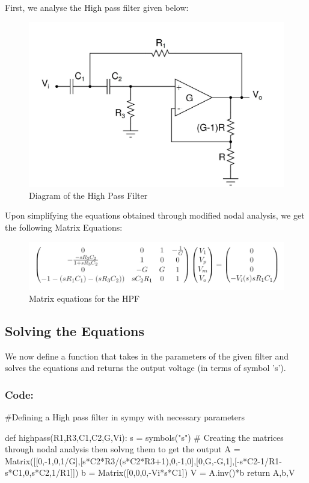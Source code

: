 \documentclass[11pt]{article}
\begin{document}
First, we analyse the High pass filter given below:

\begin{figure}[H]
    \centering
    \includegraphics[scale = 1]{HPF.jpg}
    \caption{Diagram of the High Pass Filter}
\end{figure}

Upon simplifying the equations obtained through modified nodal analysis, we get the following Matrix Equations:

\begin{figure}[H]
    \centering
    \includegraphics[scale = 0.85]{HPF_eqns.jpg}
    \caption{Matrix equations for the HPF}
\end{figure}


\subsection{Solving the Equations}
We now define a function that takes in the parameters of the given filter and solves the equations and returns the output voltage (in terms of symbol 's').

\subsubsection{Code:}
\begin{python}
#Defining a High pass filter in sympy with necessary parameters

def highpass(R1,R3,C1,C2,G,Vi):
    s = symbols("s")
	# Creating the matrices through nodal analysis then solvng them to get the output
    A = Matrix([[0,-1,0,1/G],[s*C2*R3/(s*C2*R3+1),0,-1,0],[0,G,-G,1],[-s*C2-1/R1-s*C1,0,s*C2,1/R1]])
    b = Matrix([0,0,0,-Vi*s*C1])
    V = A.inv()*b
    return A,b,V
\end{python}
\end{document}
